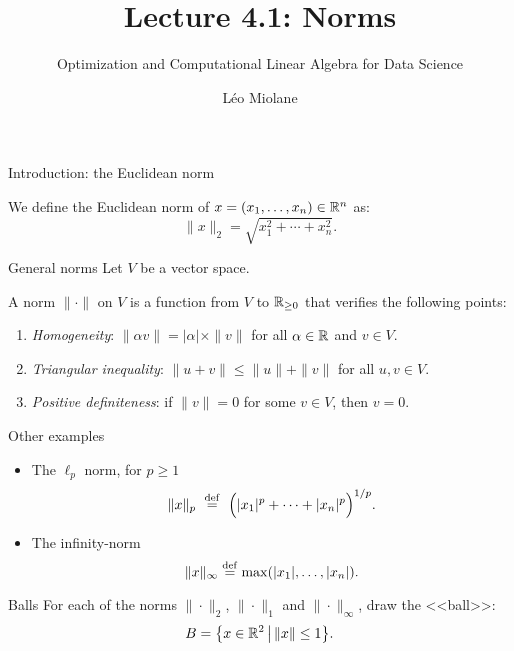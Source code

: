 \documentclass{beamer}
\title{Lecture 4.1: Norms}
\subtitle{Optimization and Computational Linear Algebra for Data Science}
\author{Léo Miolane}
\date{}
\begin{document}
\setcounter{showProgressBar}{0}
\setcounter{showSlideNumbers}{0}

\frame{\titlepage}

\setcounter{framenumber}{0}
\setcounter{showSlideNumbers}{1}
\begin{frame}[t]{Introduction: the Euclidean norm}
	\begin{definition}
		We define the Euclidean norm of $x=(x_1, \dots, x_n) \in \mathbb{R}^n$ as:
		$$
		\| x\|_2 = \sqrt{x_1^2 + \cdots + x_n^2}.
		$$
	\end{definition}


\end{frame}

\begin{frame}[t]{General norms}
	Let $V$ be a vector space.
\begin{definition}
	A norm $\| \cdot \|$ on $V$ is a function from $V$ to $\mathbb{R}_{\geq 0}$ that verifies the following points:
	\begin{enumerate}
		\item \emph{Homogeneity}: $\| \alpha v \| = |\alpha|\times \| v\|$ for all $\alpha \in \mathbb{R}$ and  $v \in V$.
		\item \emph{Triangular inequality}: $\|u + v\| \leq \|u\| + \|v\|$ for all $u,v \in V$.
		\item \emph{Positive definiteness}: if $\|v\| = 0$ for some $v \in V$, then $v=0$.
	\end{enumerate}
\end{definition}
\end{frame}


\begin{frame}[t]{Other examples}
	\begin{itemize}
\item The $\ell_p$ norm, for $p \geq 1$
	$$\|x\|_p \ \overset{\rm def}{=} \ \Big( |x_1|^p + \cdots + |x_n|^p \Big)^{1/p}.$$
		\item The infinity-norm 
			$$\|x \|_{\infty} \overset{\rm def}{=} \max(|x_1|, \dots, |x_n|).$$
	\end{itemize}
\end{frame}
\begin{frame}[t]{Balls}
	For each of the norms $\| \cdot \|_2$, $\| \cdot \|_1$ and $\| \cdot \|_{\infty}$, draw the <<ball>>:
	$$
	B = \big\{ x \in \mathbb{R}^2 \, \big| \, \|x\| \leq 1 \big\}.
	$$
\end{frame}
\end{document}
